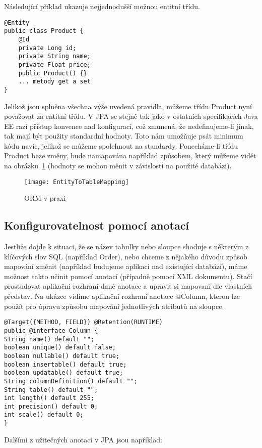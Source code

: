 \documentclass[122pt,oneside]{fithesis}
\begin{document}
Následující příklad ukazuje nejjednodušší možnou entitní třídu.

\begin{lstlisting}
@Entity
public class Product {
	@Id
	private Long id;
	private String name;
	private Float price;
	public Product() {}
	... metody get a set
}
\end{lstlisting}

Jelikož jsou splněna všechna výše uvedená pravidla, můžeme třídu Product nyní považovat za entitní třídu. V JPA se stejně tak jako v ostatních specifikacích Java EE razí přístup konvence nad konfigurací, což znamená, že nedefinujeme-li jinak, tak mají být použity standardní hodnoty. Toto nám umožňuje psát minimum kódu navíc, jelikož se můžeme spolehnout na standardy. Ponecháme-li třídu Product beze změny, bude namapována například způsobem, který můžeme vidět na obrázku~\ref{img:orm} (hodnoty se mohou měnit v závislosti na použité databázi).

\begin{figure}[!ht]
\centering
\texttt{[image: EntityToTableMapping]}
\caption{ORM v praxi}
\label{img:orm}
\end{figure}

\subsection{Konfigurovatelnost pomocí anotací}
Jestliže dojde k situaci, že se název tabulky nebo sloupce shoduje s některým z klíčových slov SQL (například Order), nebo chceme z nějakého důvodu způsob mapování změnit (například budujeme aplikaci nad existující databází), máme možnost takto učinit pomocí anotací (případně pomocí XML dokumentu). Stačí prostudovat aplikační rozhraní dané anotace a upravit si mapovaní dle vlastních představ. Na ukázce vidíme aplikační rozhraní anotace @Column, kterou lze použít pro úpravu způsobu mapování jednotlivých atributů na sloupce.

\begin{lstlisting}
@Target({METHOD, FIELD}) @Retention(RUNTIME)
public @interface Column {
String name() default "";
boolean unique() default false;
boolean nullable() default true;
boolean insertable() default true;
boolean updatable() default true;
String columnDefinition() default "";
String table() default "";
int length() default 255;
int precision() default 0;
int scale() default 0; 
}
\end{lstlisting}

Dalšími z užitečných anotací v JPA jsou například:
\end{document}
